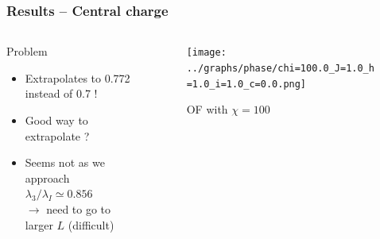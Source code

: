 \documentclass[10pt]{beamer}
\begin{document}
\begin{frame}
    \frametitle{Results -- Central charge}

    \begin{columns}
        \begin{column}{0.35\linewidth}
            \begin{block}{Problem}
                \begin{itemize}
                    \item Extrapolates to 0.772 instead of 0.7 !
                    \pause
                    \item Good way to extrapolate ?
                    \pause
                    \item Seems not as we approach $\lambda_3/\lambda_I \simeq 0.856$\\$\rightarrow$ need to go to larger $L$ (difficult)
                \end{itemize}
            \end{block}
        \end{column}        

        \begin{column}{0.75\linewidth}
            \begin{figure}
                \texttt{[image: ../graphs/phase/chi=100.0\_J=1.0\_h=1.0\_i=1.0\_c=0.0.png]}
                \caption{OF with $\chi=100$}
            \end{figure}
        \end{column}
    \end{columns}
\end{frame}
\end{document}
